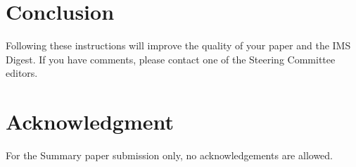 \documentclass[conference]{IEEEtran}
\begin{document}
{%
%

\section{Conclusion}
Following these instructions will improve the quality of your paper and the IMS Digest. If you have comments, please contact one of the Steering Committee editors.


\section*{Acknowledgment}
For the Summary paper submission only, no acknowledgements are allowed.




}
\end{document}
